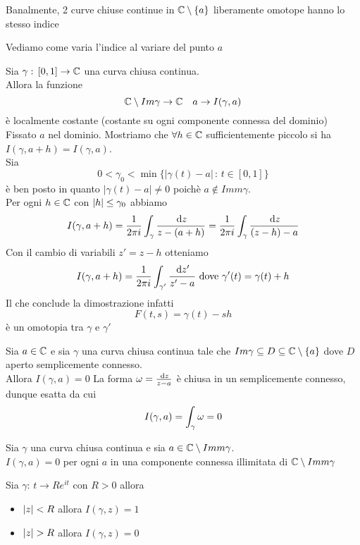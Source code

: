 \begin{oss}Banalmente, 2 curve chiuse continue in $\mathbb{C}\setminus\{a \}$ liberamente omotope hanno lo stesso indice
\end{oss}
Vediamo come varia l'indice al variare del punto $a$
\begin{prop}Sia $\gamma:\, [0,1]\to \mathbb{C}$ una curva chiusa continua.\\
Allora la funzione 
$$ \mathbb{C}\setminus  Im \gamma \to \mathbb{C} \quad a\to I(\gamma,a)$$
\`e localmente costante (costante su ogni componente connessa del  dominio)
\proof Fissato $a$ nel dominio. Mostriamo che $\forall h \in \mathbb{C}$ sufficientemente piccolo si ha $I(\gamma, a+h) = I(\gamma, a)$.\\
Sia $$0<\gamma_0< \min \{ | \gamma(t) - a| \, :\, t\in [0,1]\}$$
\`e ben posto in quanto $|\gamma(t) - a|  \neq  0 $ poich\`e $a\not \in Imm \gamma $.\\
Per ogni $h\in \mathbb{C}$ con $\left\vert h \right\vert\leq \gamma_0$ abbiamo 
$$ I(\gamma, a+h) = \frac{1}{2\pi i }\int_{\gamma } \frac{\, \mathrm{d}z}{z-(a+h)} =\frac{1}{2\pi i }\int_\gamma \frac{\, \mathrm{d}z}{(z-h)-a}$$
Con il cambio di variabili $z'= z-h$ otteniamo 
$$ I(\gamma, a +h) = \frac{1}{2\pi i }\int_{\gamma '} \frac{\, \mathrm{d}z'}{z'-a} \text{ dove } \gamma'(t) =\gamma(t) + h$$
Il che conclude la dimostrazione infatti 
$$ F(t,s) = \gamma(t) - sh $$ 
\`e un omotopia tra $\gamma $ e $\gamma'$
\end{prop}
\spazio
\begin{prop}Sia $a\in \mathbb{C}$ e sia $\gamma$ una curva chiusa continua tale che $Im\gamma \subseteq D \subseteq \mathbb{C} \setminus \{ a \}$ dove $D$ aperto semplicemente connesso.\\
Allora $I(\gamma,a) =0$
\proof  La forma $\omega=\frac{\, \mathrm{d}z}{z-a}$ \`e chiusa in un semplicemente connesso, dunque esatta da cui 
$$ I(\gamma,a) = \int_\gamma \omega = 0$$
\endproof
\end{prop}
\spazio
\begin{prop}Sia $\gamma$ una curva chiusa continua e sia $a\in \mathbb{C}\setminus Imm \gamma$.\\
$I(\gamma,a) = 0$ per ogni $a$ in una componente connessa illimitata di $\mathbb{C}\setminus Imm \gamma$
\end{prop}
\begin{ese}Sia $\gamma:\, t\to Re^{it} $ con $R>0$ allora
\begin{itemize}
\item $\left\vert z \right\vert <R$ allora $I(\gamma, z) =1$
\item $\left\vert z \right\vert >R$ allora $I(\gamma,z) = 0$
\end{itemize}
\end{ese}
